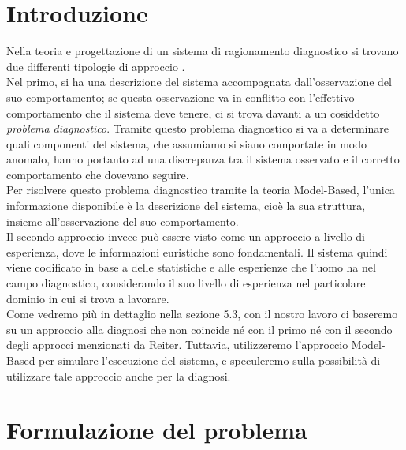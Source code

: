 \documentclass[a4paper,12pt]{report}
\begin{document}
\section{Introduzione}
Nella teoria e progettazione di un sistema di ragionamento diagnostico si trovano due differenti tipologie di approccio \cite{rif3}.\\
Nel primo, si ha una descrizione del sistema accompagnata dall'osservazione del suo comportamento; se questa osservazione va in conflitto con l'effettivo comportamento che il sistema deve tenere, ci si trova davanti a un cosiddetto \textit{problema diagnostico}.
Tramite questo problema diagnostico si va a determinare quali componenti del sistema, che assumiamo si siano comportate in modo anomalo, hanno portanto ad una discrepanza tra il sistema osservato e il corretto comportamento che dovevano seguire.\\
Per risolvere questo problema diagnostico tramite la teoria Model-Based, l'unica informazione disponibile è la descrizione del sistema, cioè la sua struttura, insieme all'osservazione del suo comportamento.\\
Il secondo approccio invece può essere visto come un approccio a livello di esperienza, dove le informazioni euristiche sono fondamentali. Il sistema quindi viene codificato in base a delle statistiche e alle esperienze che l'uomo ha nel campo diagnostico, considerando il suo livello di esperienza nel particolare dominio in cui si trova a lavorare.\\
Come vedremo più in dettaglio nella sezione 5.3, con il nostro lavoro ci baseremo su un approccio alla diagnosi che non coincide né con il primo né con il secondo degli approcci menzionati da Reiter. Tuttavia, utilizzeremo l'approccio Model-Based per simulare l'esecuzione del sistema, e speculeremo sulla possibilità di utilizzare tale approccio anche per la diagnosi.
\newpage
\section{Formulazione del problema}
\end{document}
